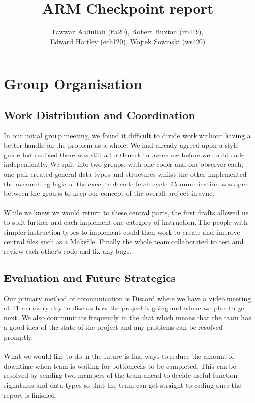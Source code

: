 \documentclass[8pt]{article}
\begin{document}
\title{ARM Checkpoint report}
\author{Fawwaz Abdullah (ffa20), Robert Buxton (rb419), \\Edward Hartley (ech120), Wojtek Sowinski (ws420) }

\maketitle

\section{Group Organisation}

\subsection{Work Distribution and Coordination}

In our initial group meeting, we found it difficult to divide work without having a
better handle on the problem as a whole. We had already agreed upon a style guide 
but realised there was still a bottleneck to overcome before we could code independently.
We split into two groups, with one coder and one observer each; one pair created general data
types and structures whilst the other implemented the overarching logic of the execute-decode-fetch cycle.
Communication was open between the groups to keep our concept of the overall project in sync. \\ \\
While we knew we would return to these central parts, the first drafts allowed us to split
further and each implement one category of instruction. The people with simpler instruction types
to implement could then work to create and improve central files such as a Makefile.
Finally the whole team collaborated to test and review each other's code and fix any bugs.

\subsection{Evaluation and Future Strategies}

Our primary method of communication is Discord where we have a video meeting at
11 am every day to discuss how the project is going and where we plan to go next.
We also communicate frequently in the chat which means that the team has a good
idea of the state of the project and any problems can be resolved promptly. \\ \\
What we would like to do in the future is find ways to reduce the amount of
downtime when team is waiting for bottlenecks to be completed. This can be resolved
by sending two members of the team ahead to decide useful function signatures and
data types so that the team can get straight to coding once the report is finished.
\end{document}
